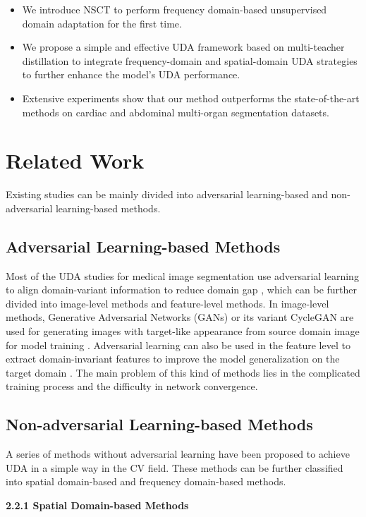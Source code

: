 \documentclass[letterpaper]{article} %
\begin{document}
\begin{itemize}
    \item We introduce NSCT to perform frequency domain-based unsupervised domain adaptation for the first time.
    \item We propose a simple and effective UDA framework based on multi-teacher distillation to integrate 
    frequency-domain and spatial-domain UDA strategies to further enhance the model's UDA performance.
    \item Extensive experiments show that our method outperforms the state-of-the-art methods on cardiac and abdominal multi-organ segmentation datasets.
\end{itemize}


\section{Related Work}
Existing studies can be mainly divided into adversarial learning-based and non-adversarial learning-based methods.

\subsection{Adversarial Learning-based Methods}
Most of the UDA studies for medical image segmentation use adversarial learning to align domain-variant information to reduce domain gap \cite{1,2,13,14,16,17,18,41}, 
which can be further divided into image-level methods and feature-level methods. In image-level methods, Generative Adversarial Networks (GANs) or its variant 
CycleGAN \cite{17} are used for generating images with target-like appearance from source domain image for model training \cite{1,2,13,14,16,17,18,41}. Adversarial learning 
can also be used in the feature level to extract domain-invariant features to improve the model generalization on the target domain \cite{2,13}. The main problem of this kind 
of methods lies in the complicated training process and the difficulty in network convergence.

\subsection{Non-adversarial Learning-based Methods}
A series of methods without adversarial learning have been proposed to achieve UDA in a simple way in the CV field. 
These methods can be further classified into spatial domain-based and frequency domain-based methods.

\noindent \textbf{2.2.1 Spatial Domain-based Methods} 
\end{document}
